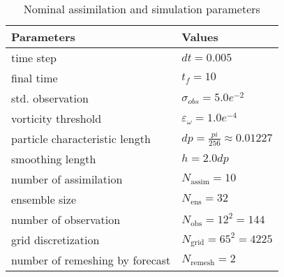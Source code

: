 \begin{table}[htbp]
    \centering
    \caption{Nominal assimilation and simulation parameters}
    \begin{tabular}[t]{|l|l|}
        \hline
        Parameters                      & Values                                 \\
        \hline
        time step                       & $dt = 0.005$                           \\
        final time                      & $t_f =10$                              \\
        std. observation                & $\sigma_{obs} =  5.0e^{-2}$            \\
        vorticity threshold             & $\varepsilon_{\omega} = 1.0e^{-4}$     \\
        particle characteristic length  & $dp = \frac{pi}{256} \approx 0.01227 $ \\
        smoothing length                & $h = 2.0 dp$                           \\
        number of assimilation          & $N_{\text{assim}} = 10$                \\
        ensemble size                   & $N_{\text{ens}} = 32$                  \\
        number of observation           & $N_{\text{obs}} = 12^2 = 144$          \\
        grid discretization             & $N_{\text{grid}} = 65^2 = 4225$        \\
        number of remeshing by forecast & $N_{\text{remesh}} =  2 $              \\
        \hline
    \end{tabular}
    \label{tab:simu_2d}
\end{table}

